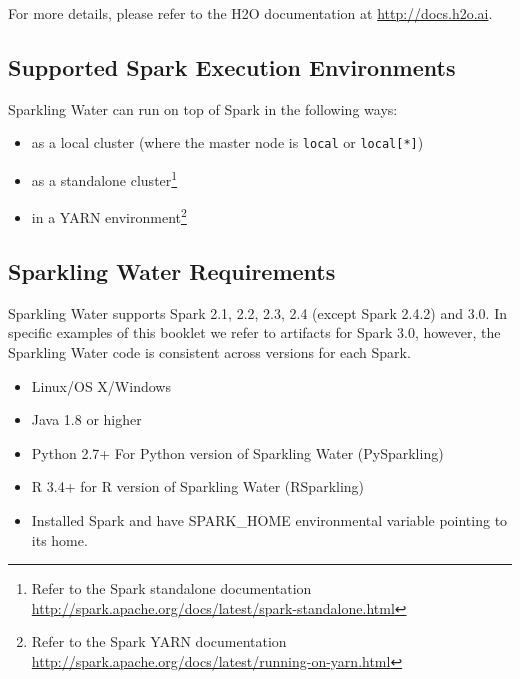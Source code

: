 \documentclass{standalone}
\begin{document}
    For more details, please refer to the H2O documentation at {\url{http://docs.h2o.ai}}.

    \subsection{Supported Spark Execution Environments}
    Sparkling Water can run on top of Spark in the following ways:
    \begin{itemize}
        \item as a local cluster (where the master node is \texttt{local} or \texttt{local[*]})
        \item as a standalone cluster\footnote{Refer to the Spark standalone documentation
        \url{http://spark.apache.org/docs/latest/spark-standalone.html}}
        \item in a YARN environment\footnote{Refer to the Spark YARN documentation \url{http://spark.apache.org/docs/latest/running-on-yarn.html}}
    \end{itemize}

    \subsection{Sparkling Water Requirements}

    Sparkling Water supports Spark 2.1, 2.2, 2.3, 2.4 (except Spark 2.4.2) and 3.0. In specific examples of this
    booklet we refer to artifacts for Spark 3.0, however, the Sparkling Water code is consistent across versions
    for each Spark.

    \begin{itemize}
        \item Linux/OS X/Windows
        \item Java 1.8 or higher
        \item Python 2.7+ For Python version of Sparkling Water (PySparkling)
        \item R 3.4+ for R version of Sparkling Water (RSparkling)
        \item Installed Spark and have SPARK\_HOME environmental variable pointing to its home.
    \end{itemize}
\end{document}
